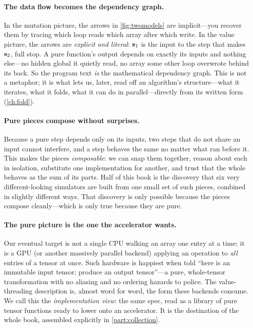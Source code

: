 \paragraph{The data flow becomes the dependency graph.}
In the mutation picture, the arrows in \cref{fig:twomodels} are implicit---you
recover them by tracing which loop reads which array after which write. In the
value picture, the arrows are \emph{explicit and literal}: $\mathbf{s}_1$ is the input to
the step that makes $\mathbf{s}_2$, full stop. A pure function's output depends on
exactly its inputs and nothing else---no hidden global it quietly read, no array
some other loop overwrote behind its back. So the program text \emph{is} the
mathematical dependency graph. This is not a metaphor; it is what lets us, later,
read off an algorithm's structure---what it iterates, what it folds, what it can
do in parallel---directly from its written form (\cref{ch:fold}).

\paragraph{Pure pieces compose without surprises.}
Because a pure step depends only on its inputs, two steps that do not share an
input cannot interfere, and a step behaves the same no matter what ran before it.
This makes the pieces \emph{composable}: we can snap them together, reason about
each in isolation, substitute one implementation for another, and trust that the
whole behaves as the sum of its parts. Half of this book is the discovery that
six very different-looking simulators are built from one small set of such pieces,
combined in slightly different ways. That discovery is only possible because the
pieces compose cleanly---which is only true because they are pure.

\paragraph{The pure picture is the one the accelerator wants.}
Our eventual target is not a single CPU walking an array one entry at a time; it
is a GPU (or another massively parallel backend) applying an operation to
\emph{all} entries of a tensor at once. Such hardware is happiest when told ``here
is an immutable input tensor; produce an output tensor''---a pure, whole-tensor
transformation with no aliasing and no ordering hazards to police. The
value-threading description is, almost word for word, the form these backends
consume. We call this the \emph{implementation view}: the same spec, read as a
library of pure tensor functions ready to lower onto an accelerator. It is the
destination of the whole book, assembled explicitly in \cref{part:collection}.

